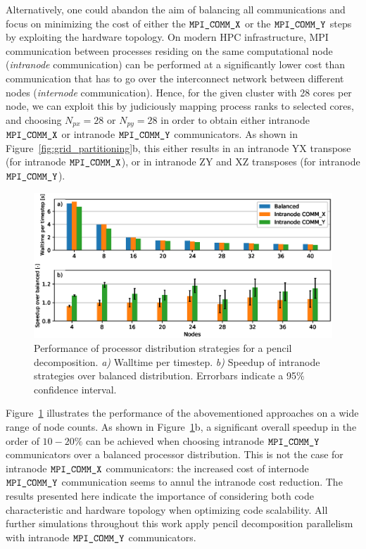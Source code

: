 Alternatively, one could abandon the aim of balancing all communications and focus on minimizing the cost of either the $\verb|MPI_COMM_X|$ or the $\verb|MPI_COMM_Y|$ steps by exploiting the hardware topology. On modern HPC infrastructure, MPI communication between processes residing on the same computational node (\emph{intranode} communication) can be performed at a significantly lower cost than communication that has to go over the interconnect network between different nodes (\emph{internode} communication). Hence, for the given cluster with 28 cores per node, we can exploit this by judiciously mapping process ranks to selected cores, and choosing $N_{px} = 28$ or $N_{py} = 28$ in order to obtain either intranode $\verb|MPI_COMM_X|$ or intranode $\verb|MPI_COMM_Y|$ communicators. As shown in Figure~\ref{fig:grid_partitioning}b, this either results in an intranode YX transpose (for intranode $\verb|MPI_COMM_X|$), or in intranode ZY and XZ transposes (for intranode $\verb|MPI_COMM_Y|$). 

\begin{figure}
	\includegraphics[width=\textwidth]{figures/meth_balanced_intranode.eps}
	\caption[Performance of processor distribution strategies for a pencil decomposition.]{Performance of processor distribution strategies for a pencil decomposition. \emph{a)} Walltime per timestep. \emph{b)} Speedup of intranode strategies over  balanced distribution. Errorbars indicate a 95$\%$ confidence interval. \label{fig:balanced_intranode}}
\end{figure}

Figure~\ref{fig:balanced_intranode} illustrates the performance of the abovementioned approaches on a wide range of node counts. As shown in Figure~\ref{fig:balanced_intranode}b, a significant overall speedup in the order of $10 - 20\%$ can be achieved when choosing intranode $\verb|MPI_COMM_Y|$ communicators over a balanced processor distribution. This is not the case for intranode $\verb|MPI_COMM_X|$ communicators: the increased cost of internode $\verb|MPI_COMM_Y|$ communication seems to annul the intranode cost reduction. The results presented here indicate the importance of considering both code characteristic and hardware topology when optimizing code scalability. All further simulations throughout this work apply pencil decomposition parallelism with intranode $\verb|MPI_COMM_Y|$ communicators.

